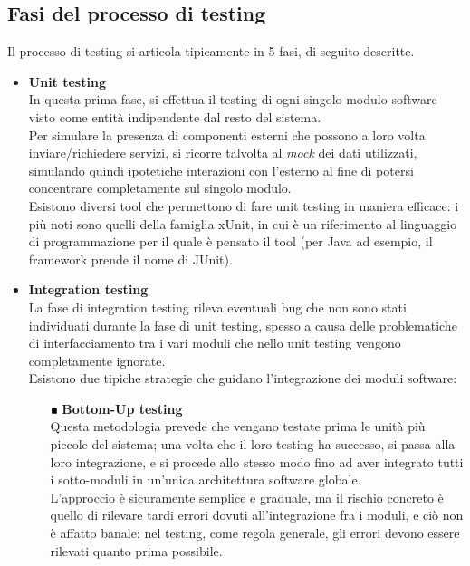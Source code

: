 \subsection{Fasi del processo di testing}
Il processo di testing si articola tipicamente in 5 fasi, di seguito descritte.\\
\begin{itemize}
\item \textbf{Unit testing}\\
In questa prima fase, si effettua il testing di ogni singolo modulo software visto come entità indipendente dal resto del sistema.\\
Per simulare la presenza di componenti esterni che possono a loro volta inviare/richiedere servizi, si ricorre talvolta al \emph{mock} dei dati utilizzati, simulando quindi ipotetiche interazioni con l'esterno al fine di potersi concentrare completamente sul singolo modulo.\\
Esistono diversi tool che permettono di fare unit testing in maniera efficace: i più noti sono quelli della famiglia xUnit, in cui  è un riferimento al linguaggio di programmazione per il quale è pensato il tool (per Java ad esempio, il framework prende il nome di JUnit).\\

\item \textbf{Integration testing}\\
La fase di integration testing rileva eventuali bug che non sono stati individuati durante la fase di unit testing, spesso a causa delle problematiche di interfacciamento tra i vari moduli che nello unit testing vengono completamente ignorate.\\
Esistono due tipiche strategie che guidano l'integrazione dei moduli software:\\
\begin{itemize}
\item [$ \Blacksquare $] \textbf{Bottom-Up testing}\\
Questa metodologia prevede che vengano testate prima le unità più piccole del sistema; una volta che il loro testing ha successo, si passa alla loro integrazione, e si procede allo stesso modo fino ad aver integrato tutti i sotto-moduli in un'unica architettura software globale.\\
L'approccio è sicuramente semplice e graduale, ma il rischio concreto è quello di rilevare tardi errori dovuti all'integrazione fra i moduli, e ciò non è affatto banale: nel testing, come regola generale, gli errori devono essere rilevati quanto prima possibile.\\


\end{itemize}
\end{itemize}
